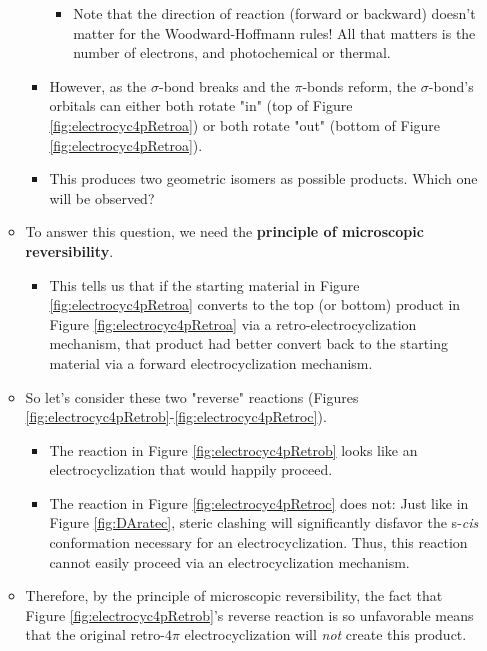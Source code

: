\documentclass[../notes.tex]{subfiles}
\begin{document}
\begin{itemize}
\begin{itemize}
\begin{itemize}
            \begin{itemize}
                \item Note that the direction of reaction (forward or backward) doesn't matter for the Woodward-Hoffmann rules! All that matters is the number of electrons, and photochemical or thermal.
            \end{itemize}
            \item However, as the $\sigma$-bond breaks and the $\pi$-bonds reform, the $\sigma$-bond's orbitals can either both rotate "in" (top of Figure \ref{fig:electrocyc4pRetroa}) or both rotate "out" (bottom of Figure \ref{fig:electrocyc4pRetroa}).
            \item This produces two geometric isomers as possible products. Which one will be observed?
        \end{itemize}
        \item To answer this question, we need the \textbf{principle of microscopic reversibility}.
        \begin{itemize}
            \item This tells us that if the starting material in Figure \ref{fig:electrocyc4pRetroa} converts to the top (or bottom) product in Figure \ref{fig:electrocyc4pRetroa} via a retro-electrocyclization mechanism, that product had better convert back to the starting material via a forward electrocyclization mechanism.
        \end{itemize}
        \item So let's consider these two "reverse" reactions (Figures \ref{fig:electrocyc4pRetrob}-\ref{fig:electrocyc4pRetroc}).
        \begin{itemize}
            \item The reaction in Figure \ref{fig:electrocyc4pRetrob} looks like an electrocyclization that would happily proceed.
            \item The reaction in Figure \ref{fig:electrocyc4pRetroc} does not: Just like in Figure \ref{fig:DAratec}, steric clashing will significantly disfavor the s-\emph{cis} conformation necessary for an electrocyclization. Thus, this reaction cannot easily proceed via an electrocyclization mechanism.
        \end{itemize}
        \item Therefore, by the principle of microscopic reversibility, the fact that Figure \ref{fig:electrocyc4pRetrob}'s reverse reaction is so unfavorable means that the original retro-$4\pi$ electrocyclization will \emph{not} create this product.

\end{itemize}
\end{itemize}
\end{document}
